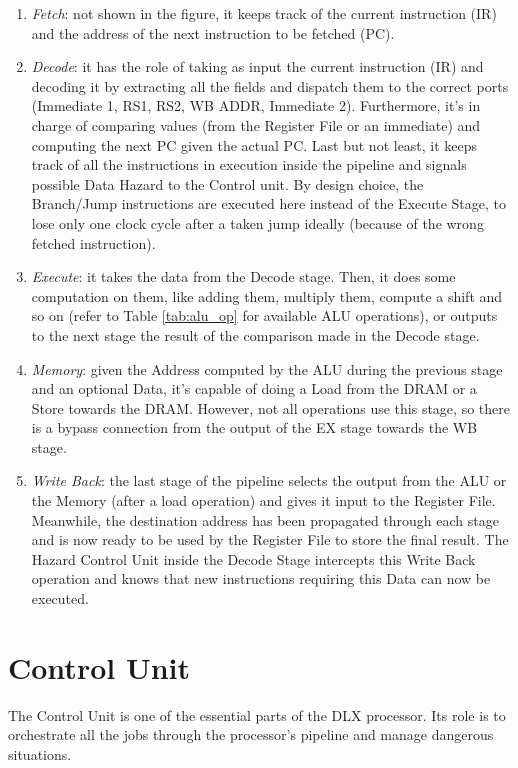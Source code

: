 \begin{enumerate}
    \item \emph{Fetch}: not shown in the figure, it keeps track of the current instruction (IR) and the address of the next instruction to be fetched (PC).
    \item \emph{Decode}: it has the role of taking as input the current instruction (IR) and decoding it by extracting all the fields and dispatch them to the correct ports (Immediate 1, RS1, RS2, WB ADDR, Immediate 2). Furthermore, it's in charge of comparing values (from the Register File or an immediate) and computing the next PC given the actual PC. Last but not least, it keeps track of all the instructions in execution inside the pipeline and signals possible Data Hazard to the Control unit. By design choice, the Branch/Jump instructions are executed here instead of the Execute Stage, to lose only one clock cycle after a taken jump ideally (because of the wrong fetched instruction).
    \item \emph{Execute}: it takes the data from the Decode stage. Then, it does some computation on them, like adding them, multiply them, compute a shift and so on (refer to Table \ref{tab:alu_op} for available ALU operations), or outputs to the next stage the result of the comparison made in the Decode stage.
    \item \emph{Memory}: given the Address computed by the ALU during the previous stage and an optional Data, it's capable of doing a Load from the DRAM or a Store towards the DRAM. However, not all operations use this stage, so there is a bypass connection from the output of the EX stage towards the WB stage.
    \item \emph{Write Back}: the last stage of the pipeline selects the output from the ALU or the Memory (after a load operation) and gives it input to the Register File. Meanwhile, the destination address has been propagated through each stage and is now ready to be used by the Register File to store the final result. The Hazard Control Unit inside the Decode Stage intercepts this Write Back operation and knows that new instructions requiring this Data can now be executed.
\end{enumerate}


\section{Control Unit}

The Control Unit is one of the essential parts of the DLX processor. Its role is to orchestrate all the jobs through the processor's pipeline and manage dangerous situations.\\

